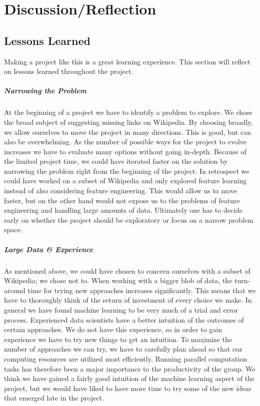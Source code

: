 \chapter{Discussion/Reflection}
\section{Lessons Learned}
Making a project like this is a great learning experience. This section will reflect on lessons learned throughout the project.

\paragraph{Narrowing the Problem}
At the beginning of a project we have to identify a problem to explore. We chose the broad subject of suggesting missing links on Wikipedia. By choosing broadly, we allow ourselves to move the project in many directions. This is good, but can also be overwhelming. As the number of possible ways for the project to evolve increases we have to evaluate many options without going in-depth. Because of the limited project time, we could have iterated faster on the solution by narrowing the problem right from the beginning of the project. In retrospect we could have worked on a subset of Wikipedia and only explored feature learning instead of also considering feature engineering. This would allow us to move faster, but on the other hand would not expose us to the problems of feature engineering and handling large amounts of data. Ultimately one has to decide early on whether the project should be exploratory or focus on a narrow problem space.

\paragraph{Large Data \& Experience}
As mentioned above, we could have chosen to concern ourselves with a subset of Wikipedia; we chose not to. When working with a bigger blob of data, the turn-around time for trying new approaches increases significantly. This means that we have to thoroughly think of the return of investment of every choice we make. In general we have found machine learning to be very much of a trial and error process. Experienced data scientists have a better intuition of the outcomes of certain approaches. We do not have this experience, so in order to gain experience we have to try new things to get an intuition. To maximize the number of approaches we can try, we have to carefully plan ahead so that our computing resources are utilized most efficiently. Running parallel computation tasks has therefore been a major importance to the productivity of the group. We think we have gained a fairly good intuition of the machine learning aspect of the project, but we would have liked to have more time to try some of the new ideas that emerged late in the project.

